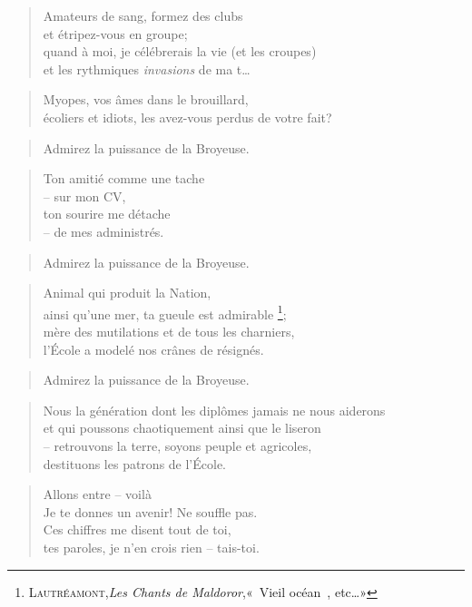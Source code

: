   \begin{verse}
    Amateurs de sang, formez des clubs\\
    et étripez-vous en groupe;\\
    quand à moi, je célébrerais la vie (et les croupes)\\
    et les rythmiques \emph{invasions} de ma t…
  \end{verse}
  \begin{verse}
    Myopes, vos âmes dans le brouillard,\\
    écoliers et idiots, les avez-vous perdus de votre fait?
  \end{verse}
  \begin{verse}
    Admirez la puissance de la Broyeuse.
  \end{verse}
  \begin{verse}
    Ton amitié comme une tache\\
    -- sur mon CV,\\
    ton sourire me détache\\
    -- de mes administrés.
  \end{verse}
  \begin{verse}
    Admirez la puissance de la Broyeuse.
  \end{verse}
  \begin{verse}
    Animal qui produit la Nation,\\
    ainsi qu’une mer, ta gueule est admirable
    \footnote{\textsc{Lautréamont},\emph{Les Chants de Maldoror},«~Vieil océan~,
     etc…»};\\
    mère des mutilations et de tous les charniers,\\
    l’École a modelé nos crânes de résignés.
  \end{verse}
  \begin{verse}
    Admirez la puissance de la Broyeuse.
  \end{verse}
  \begin{verse}
    Nous la génération dont les diplômes jamais ne nous aiderons\\
    et qui poussons chaotiquement ainsi que le liseron\\
    -- retrouvons la terre, soyons peuple et agricoles,\\
    destituons les patrons de l’École.
  \end{verse}
  \begin{verse}
    Allons entre -- voilà\\
    Je te donnes un avenir! Ne souffle pas.\\
    Ces chiffres me disent tout de toi,\\
    tes paroles, je n’en crois rien -- tais-toi.
  \end{verse}
